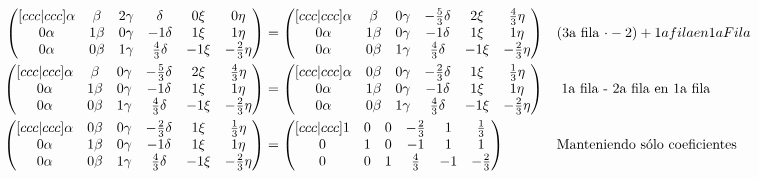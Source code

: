 \documentclass[letterpaper]{article}
\renewcommand{\*}{\cdot}
\theoremstyle{definition}
\begin{document}
\begin{align*}
		\begin{pmatrix}[ccc|ccc]
		\alpha & \beta & 2\gamma & \delta & 0\xi & 0\eta\\
		0\alpha & 1\beta & 0\gamma & -1\delta & 1\xi & 1\eta\\
		0\alpha & 0\beta & 1\gamma & \frac{4}{3}\delta & -1\xi & -\frac{2}{3}\eta
		\end{pmatrix} & = \begin{pmatrix}[ccc|ccc]
		\alpha & \beta & 0\gamma & -\frac{5}{3}\delta & 2\xi & \frac{4}{3}\eta\\
		0\alpha & 1\beta & 0\gamma & -1\delta & 1\xi & 1\eta\\
		0\alpha & 0\beta & 1\gamma & \frac{4}{3}\delta & -1\xi & -\frac{2}{3}\eta
		\end{pmatrix} && \text{(3a fila $ \* -2 $}) + 1a fila en 1a Fila  \\
		\begin{pmatrix}[ccc|ccc]
		\alpha & \beta & 0\gamma & -\frac{5}{3}\delta & 2\xi & \frac{4}{3}\eta\\
		0\alpha & 1\beta & 0\gamma & -1\delta & 1\xi & 1\eta\\
		0\alpha & 0\beta & 1\gamma & \frac{4}{3}\delta & -1\xi & -\frac{2}{3}\eta
		\end{pmatrix} & = \begin{pmatrix}[ccc|ccc]
		\alpha & 0\beta & 0\gamma & -\frac{2}{3}\delta & 1\xi & \frac{1}{3}\eta\\
		0\alpha & 1\beta & 0\gamma & -1\delta & 1\xi & 1\eta\\
		0\alpha & 0\beta & 1\gamma & \frac{4}{3}\delta & -1\xi & -\frac{2}{3}\eta
		\end{pmatrix} && \text{ 1a fila - 2a fila en 1a fila}\\
		\begin{pmatrix}[ccc|ccc]
		\alpha & 0\beta & 0\gamma & -\frac{2}{3}\delta & 1\xi & \frac{1}{3}\eta\\
		0\alpha & 1\beta & 0\gamma & -1\delta & 1\xi & 1\eta\\
		0\alpha & 0\beta & 1\gamma & \frac{4}{3}\delta & -1\xi & -\frac{2}{3}\eta
		\end{pmatrix} & = \begin{pmatrix}[ccc|ccc]
		1 & 0 & 0 & -\frac{2}{3} & 1 & \frac{1}{3}\\
		0 & 1 & 0 & -1 & 1 & 1\\
		0 & 0 & 1 & \frac{4}{3} & -1 & -\frac{2}{3}
		\end{pmatrix} &&  \text{Manteniendo sólo coeficientes}
	\end{align*}
	
\end{document}
